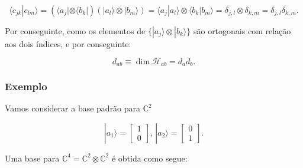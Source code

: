 \documentclass[11pt]{article}
\begin{document}
\begin{equation}
\langle c_{jk}|c_{lm}\rangle = (\langle a_{j}|\otimes\langle b_{k}|)(|a_{l}\rangle\otimes|b_{m}\rangle) = \langle a_{j}|a_{l}\rangle\otimes\langle b_{k}|b_{m}\rangle = \delta_{j,l}\otimes\delta_{k,m} = \delta_{j,l}\delta_{k,m}.
\end{equation}

Por conseguinte, como os elementos de
\(\{|a_{j}\rangle\otimes|b_{k}\rangle\}\) são ortogonais com relação aos
dois índices, e por conseguinte:

\begin{equation}
d_{ab}\equiv\dim\mathcal{H}_{ab} = d_{a}d_{b}.
\end{equation}

    \subsubsection{Exemplo}\label{exemplo}

Vamos considerar a base padrão para \(\mathbb{C}^{2}\)

\begin{equation}
|a_{1}\rangle=\begin{bmatrix}1\\0\end{bmatrix}\text{, }|a_{2}\rangle=\begin{bmatrix}0\\1\end{bmatrix}.
\end{equation}

Uma base para \(\mathbb{C}^{4}=\mathbb{C}^{2}\otimes\mathbb{C}^{2}\) é
obtida como segue:
\end{document}
